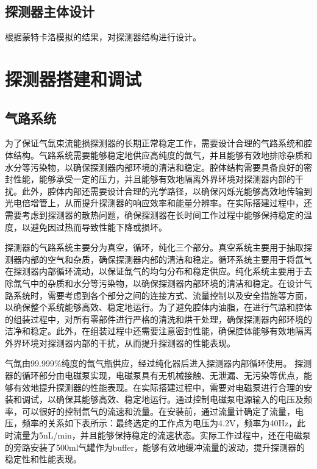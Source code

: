 \section{探测器主体设计}
根据蒙特卡洛模拟的结果，对探测器结构进行设计。




\clearpage

\chapter{探测器搭建和调试}
\section{气路系统}
为了保证气氙束流能损探测器的长期正常稳定工作，需要设计合理的气路系统和腔体结构。气路系统需要能够稳定地供应高纯度的氙气，并且能够有效地排除杂质和水分等污染物，以确保探测器内部环境的清洁和稳定。腔体结构需要具备良好的密封性能，能够承受一定的压力，并且能够有效地隔离外界环境对探测器内部的干扰。此外，腔体内部还需要设计合理的光学路径，以确保闪烁光能够高效地传输到光电倍增管上，从而提升探测器的响应效率和能量分辨率。在实际搭建过程中，还需要考虑到探测器的散热问题，确保探测器在长时间工作过程中能够保持稳定的温度，以避免因过热而导致性能下降或损坏。

探测器的气路系统主要分为真空，循环，纯化三个部分。真空系统主要用于抽取探测器内部的空气和杂质，确保探测器内部的清洁和稳定。循环系统主要用于将氙气在探测器内部循环流动，以保证氙气的均匀分布和稳定供应。纯化系统主要用于去除氙气中的杂质和水分等污染物，以确保探测器内部环境的清洁和稳定。在设计气路系统时，需要考虑到各个部分之间的连接方式、流量控制以及安全措施等方面，以确保整个系统能够高效、稳定地运行。为了避免腔体内油脂，在进行气路和腔体的组装过程中，对所有零部件进行严格的清洗和烘干处理，确保探测器内部环境的洁净和稳定。此外，在组装过程中还需要注意密封性能，确保腔体能够有效地隔离外界环境对探测器内部的干扰，从而提升探测器的性能表现。

气氙由99.999\%纯度的氙气瓶供应，经过纯化器后进入探测器内部循环使用。
探测器的循环部分由电磁泵实现，电磁泵具有无机械接触、无泄漏、无污染等优点，能够有效地提升探测器的性能表现。在实际搭建过程中，需要对电磁泵进行合理的安装和调试，以确保其能够高效、稳定地运行。通过控制电磁泵电源输入的电压及频率，可以很好的控制氙气的流速和流量。在安装前，通过流量计确定了流量，电压，频率的关系如下表所示：最终选定的工作点为电压为4.2V，频率为40Hz，此时流量为5nL/min，并且能够保持稳定的流速状态。实际工作过程中，还在电磁泵的旁路安装了500ml气罐作为buffer，能够有效地缓冲流量的波动，提升探测器的稳定性和性能表现。

